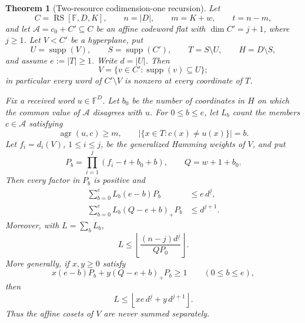 \documentclass[11pt,a4paper]{amsart}
\numberwithin{equation}{section}
\newtheorem{theorem}{Theorem}[section]
\theoremstyle{remark}
\DeclareMathOperator{\RS}{RS}\DeclareMathOperator{\MCA}{MCA}\DeclareMathOperator{\CA}{CA}
\DeclareMathOperator{\supp}{supp}\DeclareMathOperator{\Fib}{Fib}\DeclareMathOperator{\Sym}{Sym}
\newcommand{\F}{\mathbb F}\newcommand{\B}{\mathbb B}\newcommand{\K}{\mathbb K}\newcommand{\Z}{\mathbb Z}
\begin{document}
\begin{theorem}[Two-resource codimension-one recursion]
\label{thm:codim-one-recursion}
Let
\[
 C=\RS[\F,D,K],\qquad n=|D|,\qquad m=K+w,\qquad t=n-m,
\]
and let \(\mathcal A=c_0+C'\subseteq C\) be an affine codeword flat with
\(\dim C'=j+1\), where \(j\ge1\).  Let \(V<C'\) be a hyperplane, put
\[
 U=\supp(V),\qquad S=\supp(C'),\qquad
 T=S\setminus U,\qquad H=D\setminus S,
\]
and assume \(e:=|T|\ge1\).  Write \(d=|U|\).  Then
\begin{equation}
 V=\{v\in C':\supp(v)\subseteq U\};
 \label{eq:codim-one-saturation}
\end{equation}
in particular every word of \(C'\setminus V\) is nonzero at every
coordinate of \(T\).

Fix a received word \(u\in\F^D\).  Let \(b_0\) be the number of
coordinates in \(H\) on which the common value of \(\mathcal A\)
disagrees with \(u\).  For \(0\le b\le e\), let \(L_b\) count the
members \(c\in\mathcal A\) satisfying
\[
 \operatorname{agr}(u,c)\ge m,
 \qquad
 |\{x\in T:c(x)\ne u(x)\}|=b.
\]
Let \(f_i=d_i(V)\), \(1\le i\le j\), be the generalized Hamming weights
of \(V\), and put
\begin{equation}
 P_b=\prod_{i=1}^{j}(f_i-t+b_0+b),
 \qquad Q=w+1+b_0.
 \label{eq:codim-one-profile}
\end{equation}
Then every factor in \(P_b\) is positive and
\begin{align}
 \sum_{b=0}^{e}L_b(e-b)P_b
 &\le e\,d^{\underline j},
 \label{eq:codim-one-T-resource}\\
 \sum_{b=0}^{e}L_b(Q-e+b)_+P_b
 &\le d^{\underline{j+1}}.
 \label{eq:codim-one-U-resource}
\end{align}
Moreover, with \(L=\sum_bL_b\),
\begin{equation}
 L\le
 \left\lfloor
 \frac{(n-j)d^{\underline j}}{QP_0}
 \right\rfloor .
 \label{eq:codim-one-all-extenders}
\end{equation}
More generally, if \(x,y\ge0\) satisfy
\begin{equation}
 x(e-b)P_b+y(Q-e+b)_+P_b\ge1
 \qquad(0\le b\le e),
 \label{eq:codim-one-dual-feasible}
\end{equation}
then
\begin{equation}
 L\le
 \left\lfloor
 xe\,d^{\underline j}+y\,d^{\underline{j+1}}
 \right\rfloor .
 \label{eq:codim-one-dual-bound}
\end{equation}
Thus the affine cosets of \(V\) are never summed separately.
\end{theorem}
\end{document}
